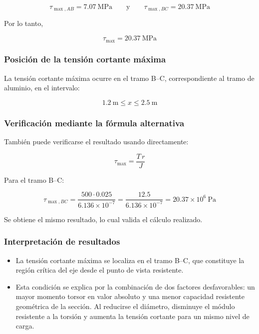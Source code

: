 \documentclass[12pt,a4paper]{article}
\begin{document}
\begin{enumerate}
\begin{equation}
\tau_{\max,AB}=7.07\ \text{MPa}
\qquad \text{y} \qquad
\tau_{\max,BC}=20.37\ \text{MPa}
\end{equation}

Por lo tanto,

\begin{equation}
\boxed{\tau_{\max}=20.37\ \text{MPa}}
\end{equation}

\subsubsection*{Posición de la tensión cortante máxima}

La tensión cortante máxima ocurre en el tramo B--C, correspondiente al tramo de aluminio, en el intervalo:

\begin{equation}
\boxed{1.2\ \text{m} \leq x \leq 2.5\ \text{m}}
\end{equation}

\subsubsection*{Verificación mediante la fórmula alternativa}

También puede verificarse el resultado usando directamente:

\begin{equation}
\tau_{\max}=\frac{T\,r}{J}
\end{equation}

Para el tramo B--C:

\begin{equation}
\tau_{\max,BC}
=\frac{500\cdot 0.025}{6.136\times 10^{-7}}
=\frac{12.5}{6.136\times 10^{-7}}
=20.37\times 10^6\ \text{Pa}
\end{equation}

Se obtiene el mismo resultado, lo cual valida el cálculo realizado.
\subsubsection*{Interpretación de resultados}

\begin{itemize}
    \item La tensión cortante máxima se localiza en el tramo B--C, que constituye la región crítica del eje desde el punto de vista resistente.
    
    \item Esta condición se explica por la combinación de dos factores desfavorables: un mayor momento torsor en valor absoluto y una menor capacidad resistente geométrica de la sección. Al reducirse el diámetro, disminuye el módulo resistente a la torsión y aumenta la tensión cortante para un mismo nivel de carga.
    

\end{itemize}
\end{enumerate}
\end{document}
